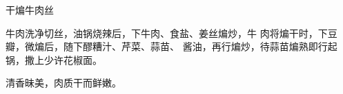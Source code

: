\begin{recipe}{干煸牛肉丝}

\ingredients


\cooking

牛肉洗净切丝，油锅烧辣后，下牛肉、食盐、姜丝煸炒，牛
肉将煸干时，下豆瓣，微煸后，随下醪糟汁、芹菜、蒜苗、
酱油，再行煸炒，待蒜苗煸熟即行起锅，撒上少许花椒面。

\notes

清香昧美，肉质干而鲜嫩。

\end{recipe}

